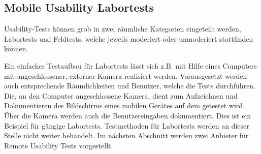 \subsection{Mobile Usability Labortests}
Usability-Tests können grob in zwei räumliche Kategorien eingeteilt werden, Labortests und Feldtests, welche jeweils moderiert oder unmoderiert stattfinden können.

Ein einfacher Testaufbau für Labortests lässt sich z.B. mit Hilfe eines Computers mit angeschlossener, externer Kamera realisiert werden. 
Vorausgesetzt werden auch entsprechende Räumlichkeiten und Benutzer, welche die Tests durchführen.
Die, an den Computer angeschlossene Kamera, dient zum Aufzeichnen und Dokumentieren des Bildschirms eines mobilen Gerätes auf dem getestet wird.
Über die Kamera werden auch die Benutzereingaben dokumentiert. \cite[Vgl.][]{Budiu.2014}
Dies ist ein Beispiel für gängige Labortests.
Testmethoden für Labortests werden an dieser Stelle nicht weiter behandelt.
Im nächsten Abschnitt werden zwei Anbieter für Remote Usability Tests vorgestellt.
